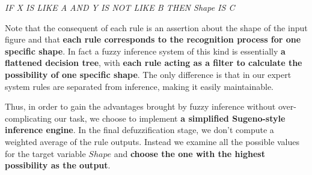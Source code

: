 \textit{IF X IS LIKE A AND Y IS NOT LIKE B THEN Shape IS C}

Note that the consequent of each rule is an assertion about the shape of the input figure and that \textbf{each rule corresponds to the recognition process for one specific shape}. In fact a fuzzy inference system of this kind is essentially \textbf{a flattened decision tree}, with \textbf{each rule acting as a filter to calculate the possibility of one specific shape}. The only difference is that in our expert system rules are separated from inference, making it easily maintainable.

Thus, in order to gain the advantages brought by fuzzy inference without over-complicating our task, we choose to implement \textbf{a simplified Sugeno-style inference engine}. In the final defuzzification stage, we don't compute a weighted average of the rule outputs. Instead we examine all the possible values for the target variable $Shape$ and \textbf{choose the one with the highest possibility as the output}.
